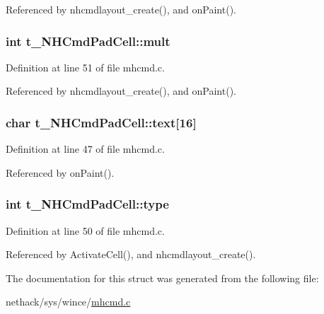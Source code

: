 Referenced by nhcmdlayout\+\_\+create(), and on\+Paint().

\hypertarget{structt__NHCmdPadCell_af9f8628557b1a7272f4422d218bd020f}{
\subsubsection[{mult}]{\setlength{\rightskip}{0pt plus 5cm}int t\+\_\+\+N\+H\+Cmd\+Pad\+Cell\+::mult}}\label{structt__NHCmdPadCell_af9f8628557b1a7272f4422d218bd020f}


Definition at line 51 of file mhcmd.\+c.



Referenced by nhcmdlayout\+\_\+create(), and on\+Paint().

\hypertarget{structt__NHCmdPadCell_ac4dbb4412979fff9f460a05132632e22}{
\subsubsection[{text}]{\setlength{\rightskip}{0pt plus 5cm}char t\+\_\+\+N\+H\+Cmd\+Pad\+Cell\+::text\mbox{[}16\mbox{]}}}\label{structt__NHCmdPadCell_ac4dbb4412979fff9f460a05132632e22}


Definition at line 47 of file mhcmd.\+c.



Referenced by on\+Paint().

\hypertarget{structt__NHCmdPadCell_a464e4e2f7bac75b51641f975a4e7d7c1}{
\subsubsection[{type}]{\setlength{\rightskip}{0pt plus 5cm}int t\+\_\+\+N\+H\+Cmd\+Pad\+Cell\+::type}}\label{structt__NHCmdPadCell_a464e4e2f7bac75b51641f975a4e7d7c1}


Definition at line 50 of file mhcmd.\+c.



Referenced by Activate\+Cell(), and nhcmdlayout\+\_\+create().



The documentation for this struct was generated from the following file\+:\begin{DoxyCompactItemize}
\item 
nethack/sys/wince/\hyperlink{mhcmd_8c}{mhcmd.\+c}\end{DoxyCompactItemize}
